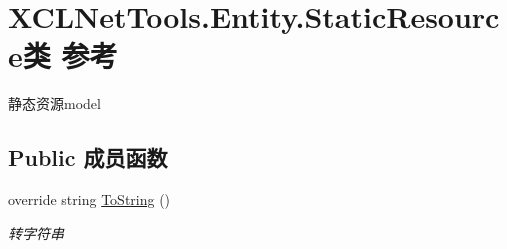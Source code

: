 \hypertarget{class_x_c_l_net_tools_1_1_entity_1_1_static_resource}{}\section{X\+C\+L\+Net\+Tools.\+Entity.\+Static\+Resource类 参考}
\label{class_x_c_l_net_tools_1_1_entity_1_1_static_resource}


静态资源model  


\subsection*{Public 成员函数}
\begin{DoxyCompactItemize}
\item 
override string \hyperlink{class_x_c_l_net_tools_1_1_entity_1_1_static_resource_a25e28841491afc79dc1f60fb6b42b60c}{To\+String} ()
\begin{DoxyCompactList}\small\item\em 转字符串 \end{DoxyCompactList}\end{DoxyCompactItemize}
